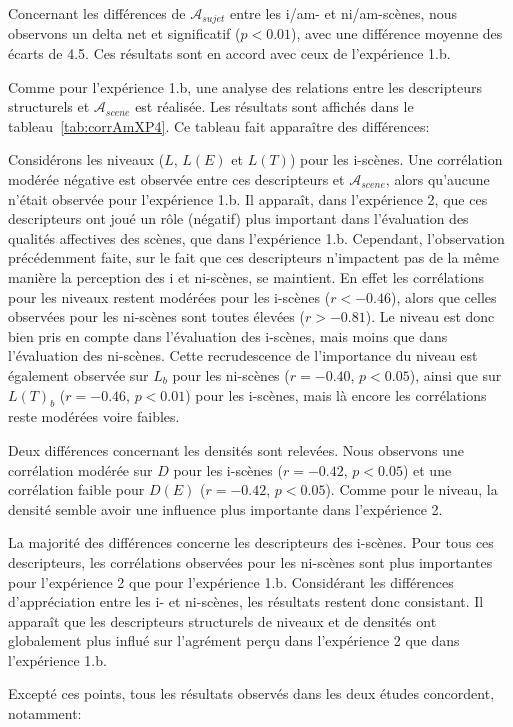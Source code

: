 Concernant les différences de $\mathcal{A}_{sujet}$ entre les i/am- et ni/am-scènes, nous observons un delta net et significatif ($p<0.01$), avec une différence moyenne des écarts de 4.5. Ces résultats sont en accord avec ceux de l'expérience 1.b.

Comme pour l'expérience 1.b, une analyse des relations entre les descripteurs structurels et $\mathcal{A}_{scene}$ est réalisée. Les résultats sont affichés dans le tableau~\ref{tab:corrAmXP4}. Ce tableau fait apparaître des différences: 

Considérons les niveaux ($L$, $L(E)$ et $L(T)$) pour les i-scènes. Une corrélation modérée négative est observée entre ces descripteurs et $\mathcal{A}_{scene}$, alors qu'aucune n'était observée pour l'expérience 1.b. Il apparaît, dans l'expérience 2, que ces descripteurs ont joué un rôle (négatif) plus important dans l'évaluation des qualités affectives des scènes, que dans l'expérience 1.b. Cependant, l'observation précédemment faite, sur le fait que ces descripteurs n'impactent pas de la même manière la perception des i et ni-scènes, se maintient. En effet les corrélations pour les niveaux restent modérées pour les i-scènes ($r<-0.46$), alors que celles observées pour les ni-scènes sont toutes élevées ($r>-0.81$). Le niveau est donc bien pris en compte dans l'évaluation des i-scènes, mais moins que dans l'évaluation des ni-scènes. Cette recrudescence de l'importance du niveau est également observée sur $L_b$ pour les ni-scènes ($r=-0.40$, $p<0.05$), ainsi que sur $L(T)_b$ ($r=-0.46$, $p<0.01$) pour les i-scènes, mais là encore les corrélations reste modérées voire faibles.

Deux différences concernant les densités sont relevées. Nous observons une corrélation modérée sur $D$ pour les i-scènes ($r=-0.42$, $p<0.05$) et une corrélation faible pour $D(E)$ ($r=-0.42$, $p<0.05$). Comme pour le niveau, la densité semble avoir une influence plus importante dans l'expérience 2. 

La majorité des différences concerne les descripteurs des i-scènes. Pour tous ces descripteurs, les corrélations observées pour les ni-scènes sont plus importantes pour l'expérience 2 que pour l'expérience 1.b. Considérant les différences d'appréciation entre les i- et ni-scènes, les résultats restent donc consistant. Il apparaît que les descripteurs structurels de niveaux et de densités ont globalement plus influé sur l'agrément perçu dans l'expérience 2 que dans l'expérience 1.b.

Excepté ces points, tous les résultats observés dans les deux études concordent, notamment:

